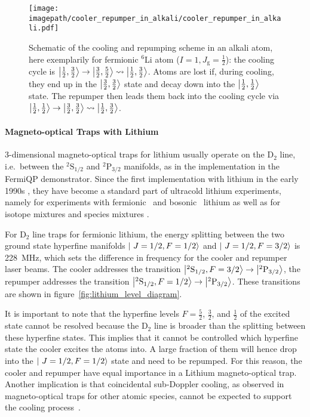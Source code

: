 \begin{figure}
    \centering
    \texttt{[image: \\imagepath/cooler\_repumper\_in\_alkali/cooler\_repumper\_in\_alkali.pdf]}
    \caption{Schematic of the cooling and repumping scheme in an alkali atom, here exemplarily for fermionic $^6$Li atom ($I = 1, J_\text{g} = \frac{1}{2}$): the cooling cycle is $\Ket{\frac{1}{2}, \frac{3}{2}} \rightarrow \Ket{\frac{3}{2}, \frac{5}{2}} \rightsquigarrow \Ket{\frac{1}{2}, \frac{3}{2}}$. Atoms are lost if, during cooling, they end up in the $\Ket{\frac{3}{2}, \frac{3}{2}}$ state and decay down into the $\Ket{\frac{1}{2}, \frac{1}{2}}$ state. The repumper then leads them back into the cooling cycle via $\Ket{\frac{1}{2}, \frac{1}{2}} \rightarrow \Ket{\frac{3}{2}, \frac{3}{2}} \rightsquigarrow \Ket{\frac{1}{2}, \frac{3}{2}}$.}
    \label{fig:cooler_repumper_in_alkali}
\end{figure}


\paragraph{Magneto-optical Traps with Lithium}
3-dimensional magneto-optical traps for lithium usually operate on the D$_2$ line, i.e.~between the $^2\text{S}_{1/2}$ and $^2\text{P}_{3/2}$ manifolds, as in the implementation in the FermiQP demonstrator. Since the first implementation with lithium in the early 1990s \cite{kawanaka_decay_1993}, they have become a standard part of ultracold lithium experiments, namely for experiments with fermionic~\cite{duarte_all-optical_2011,omran_microscopic_2015} and bosonic~\cite{kawanaka_decay_1993,schunemann_magneto-optic_1998} lithium as well as for isotope mixtures \cite{mewes_simultaneous_1999, hilker_laser_2012,kerkmann_novel_2019} and species mixtures \cite{ladouceur_compact_2009,tiecke_high-flux_2009,chen_lithium-cesium_2021}. 

For D$_2$ line traps for fermionic lithium, the energy splitting between the two ground state hyperfine manifolds $\Ket{~J=1/2, F=1/2}$ and $\Ket{~J=1/2, F=3/2}$ is \SI{228}{\mega\hertz}, which sets the difference in frequency for the cooler and repumper laser beams. The cooler addresses the transition $\Ket{^2\text{S}_{1/2}, F = 3/2} \rightarrow \Ket{^2\text{P}_{3/2}}$, the repumper addresses the transition $\Ket{^2\text{S}_{1/2}, F = 1/2} \rightarrow \Ket{^2\text{P}_{3/2}}$. These transitions are shown in figure~\ref{fig:lithium_level_diagram}.

It is important to note that the hyperfine levels $F = \frac{5}{2}$, $\frac{3}{2}$, and $\frac{1}{2}$ of the excited state cannot be resolved because the D$_2$ line is broader than the splitting between these hyperfine states. This implies that it cannot be controlled which hyperfine state the cooler excites the atoms into. A large fraction of them will hence drop into the $\Ket{~J=1/2, F=1/2}$ state and need to be repumped. For this reason, the cooler and repumper have equal importance in a Lithium magneto-optical trap. Another implication is that coincidental sub-Doppler cooling, as observed in magneto-optical traps for other atomic species, cannot be expected to support the cooling process~\cite{grier_lambda-enhanced_2013}.

